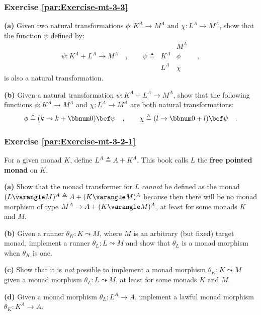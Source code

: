 \subsubsection{Exercise \label{par:Exercise-mt-3-3}\ref{par:Exercise-mt-3-3}}

\textbf{(a)} Given two natural transformations $\phi:K^{A}\rightarrow M^{A}$
and $\chi:L^{A}\rightarrow M^{A}$, show that the function $\psi$
defined by:
\[
\psi:K^{A}+L^{A}\rightarrow M^{A}\quad,\quad\quad\psi\triangleq\,\begin{array}{|c||c|}
 & M^{A}\\
\hline K^{A} & \phi\\
L^{A} & \chi
\end{array}\quad,
\]
 is also a natural transformation.

\textbf{(b)} Given a natural transformation $\psi:K^{A}+L^{A}\rightarrow M^{A}$,
show that the following functions $\phi:K^{A}\rightarrow M^{A}$ and
$\chi:L^{A}\rightarrow M^{A}$ are both natural transformations:
\[
\phi\triangleq(k\rightarrow k+\bbnum 0)\bef\psi\quad,\quad\quad\chi\triangleq(l\rightarrow\bbnum 0+l)\bef\psi\quad.
\]


\subsubsection{Exercise \label{par:Exercise-mt-3-2-1}\ref{par:Exercise-mt-3-2-1}}

For a given monad $K$, define $L^{A}\triangleq A+K^{A}$. This book
calls $L$ the \textbf{free pointed monad} on $K$.

\textbf{(a)} Show that the monad transformer for $L$ \emph{cannot}
be defined as the monad $(L\varangle M)^{A}\triangleq A+(K\varangle M)^{A}$
because then there will be no monad morphism of type $M^{A}\rightarrow A+(K\varangle M)^{A}$,
at least for some monads $K$ and $M$.

\textbf{(b)} Given a runner $\theta_{K}:K\leadsto M$, where $M$
is an arbitrary (but fixed) target monad, implement a runner $\theta_{L}:L\leadsto M$
and show that $\theta_{L}$ is a monad morphism when $\theta_{K}$
is one.

\textbf{(c)} Show that it is \emph{not} possible to implement a monad
morphism $\theta_{K}:K\leadsto M$ given a monad morphism $\theta_{L}:L\leadsto M$,
at least for some monads $K$ and $M$.

\textbf{(d)} Given a monad morphism $\theta_{L}:L^{A}\rightarrow A$,
implement a lawful monad morphism $\theta_{K}:K^{A}\rightarrow A$. 

